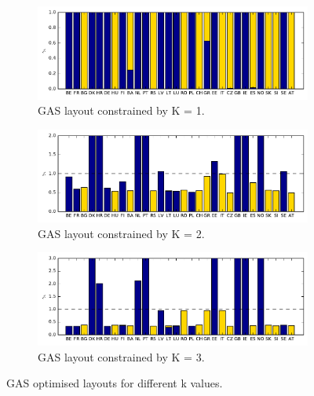 \documentclass[a4paper, 5p, sort&compress]{elsarticle}%
\newcommand{\chromowidth}{1.00 \columnwidth}
\begin{document}
\begin{figure}[p!]
  \centering
  \begin{subfigure}{2\columnwidth}
    \includegraphics[width = \chromowidth, center]{chromosome_k=1gas}
    \caption{GAS layout constrained by K = 1.}
    \label{fig:betaOpt}
  \end{subfigure}
  \begin{subfigure}{2\columnwidth}
    \includegraphics[width = \chromowidth, center]{chromosome_k=2gas}
    \caption{GAS layout constrained by K = 2.}
    \label{fig:cfMaxOpt}
  \end{subfigure}
  \begin{subfigure}{2\columnwidth}
    \includegraphics[width = \chromowidth, center]{chromosome_k=3gas}
    \caption{GAS layout constrained by K = 3.}
    \label{fig:agdOpt}
  \end{subfigure}
  \caption{GAS optimised layouts for different k values.}
  \label{fig:optLayouts}
\end{figure}
\end{document}

